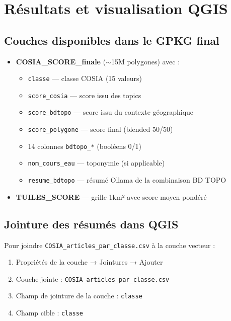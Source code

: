 \documentclass[11pt,a4paper]{report}
\newcommand{\code}[1]{\texttt{\small #1}}
\newcommand{\bdtopo}{\textsc{BD TOPO}}
\begin{document}
\section{Résultats et visualisation QGIS}

\subsection{Couches disponibles dans le GPKG final}

\begin{itemize}
  \item \textbf{COSIA\_SCORE\_finale} ($\sim$15M polygones) avec :
    \begin{itemize}
      \item \code{classe} — classe COSIA (15 valeurs)
      \item \code{score\_cosia} — score issu des topics
      \item \code{score\_bdtopo} — score issu du contexte géographique
      \item \code{score\_polygone} — score final (blended 50/50)
      \item 14 colonnes \code{bdtopo\_*} (booléens 0/1)
      \item \code{nom\_cours\_eau} — toponymie (si applicable)
      \item \code{resume\_bdtopo} — résumé Ollama de la combinaison \bdtopo{}
    \end{itemize}
  \item \textbf{TUILES\_SCORE} — grille 1km² avec score moyen pondéré
\end{itemize}

\subsection{Jointure des résumés dans QGIS}

Pour joindre \code{COSIA\_articles\_par\_classe.csv} à la couche vecteur :
\begin{enumerate}
  \item Propriétés de la couche → Jointures → Ajouter
  \item Couche jointe : \code{COSIA\_articles\_par\_classe.csv}
  \item Champ de jointure de la couche : \code{classe}
  \item Champ cible : \code{classe}
\end{enumerate}
\end{document}
